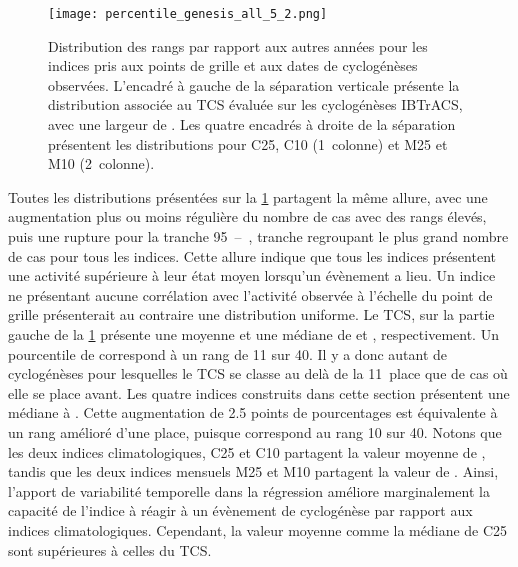\documentclass[../main.tex]{subfiles}
\begin{document}
\begin{figure}[tp]
    \centering
    \texttt{[image: percentile\_genesis\_all\_5\_2.png]}
    \caption{Distribution des rangs par rapport aux autres années pour les indices pris aux points de grille et aux dates de cyclogénèses observées. L'encadré à
    gauche de la séparation verticale présente la distribution associée au TCS évaluée sur les cyclogénèses IBTrACS, avec une largeur de . Les quatre
    encadrés à droite de la séparation présentent les distributions pour C25, C10 (1\iere~colonne) et M25 et M10 (2\ieme~colonne).}
    \label{fig:percentile_genesis_all}
\end{figure}

Toutes les distributions présentées sur la \cref{fig:percentile_genesis_all} partagent la même allure, avec une augmentation plus ou moins régulière du nombre
de cas avec des rangs élevés, puis une rupture pour la tranche 95~--~, tranche regroupant le plus grand nombre de cas pour tous les indices. Cette
allure indique que tous les indices présentent une activité supérieure à leur état moyen lorsqu'un évènement a lieu. Un indice ne présentant aucune corrélation
avec l'activité observée à l'échelle du point de grille présenterait au contraire une distribution uniforme. Le TCS, sur la partie gauche de la
\cref{fig:percentile_genesis_all} présente une moyenne et une médiane de  et , respectivement. Un pourcentile de  correspond à
un rang de \num{11} sur \num{40}. Il y a donc autant de cyclogénèses pour lesquelles le TCS se classe au delà de la \num{11}\ieme~place que de cas où elle se
place avant. Les quatre indices construits dans cette section présentent une médiane à . Cette augmentation de \num{2.5} points de pourcentages est
équivalente à un rang amélioré d'une place, puisque  correspond au rang \num{10} sur \num{40}. Notons que les deux indices climatologiques, C25 et C10
partagent la valeur moyenne de , tandis que les deux indices mensuels M25 et M10 partagent la valeur de . Ainsi, l'apport de variabilité
temporelle dans la régression améliore marginalement la capacité de l'indice à réagir à un évènement de cyclogénèse par rapport aux indices climatologiques.
Cependant, la valeur moyenne comme la médiane de C25 sont supérieures à celles du TCS.
\end{document}
